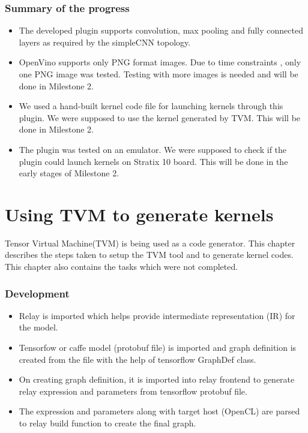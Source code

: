\documentclass[titlepage]{report}
\begin{document}
\subsection{Summary of the progress}
\begin{itemize}
    \item The developed plugin supports convolution, max pooling and fully connected layers as required by the simpleCNN topology.
    \item OpenVino supports only PNG format images. Due to time constraints , only one PNG image was tested. Testing with more images is needed and will be done in Milestone 2.
    \item We used a hand-built kernel code file for launching kernels through this plugin. We were supposed  to use the kernel generated by TVM. This will be done in Milestone 2.
    \item The plugin was tested on an emulator. We were supposed to check if the plugin could launch kernels on Stratix 10 board. This will be done in the early stages of Milestone 2.
 
\end{itemize} 



\chapter{Using TVM to generate kernels}
Tensor Virtual Machine(TVM)  is being used as a code generator. This chapter describes the steps taken to setup the TVM tool and to generate kernel codes. This chapter also contains the tasks which were not completed.
\subsection{Development}
\begin{itemize}
    \item  Relay is imported which helps provide intermediate representation (IR) for the model.
    \item Tensorfow or caffe model (protobuf file) is imported and graph definition is created from the file with the help of tensorflow GraphDef class.
    \item On creating graph definition, it is imported into relay frontend to generate relay expression and parameters from tensorflow protobuf file. 
    \item The expression and parameters along with target host (OpenCL) are parsed to relay build function to create the final graph. 
\end{itemize}
\end{document}

